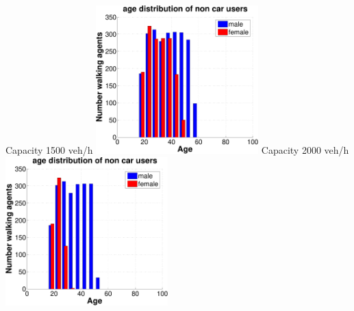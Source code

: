 {  \createsubfigure%
  {Capacity 1500 veh/h}%
  {\includegraphics[width=0.47\textwidth, angle=0, trim=0mm 0mm 0mm 9mm, clip=true]{extending/figures/MultiModalSimulation/simulations/age_distribution_scatter_1500}}%
  {\label{}}%
  {\hspace{3mm}}%
  \createsubfigure%
  {Capacity 2000 veh/h}%
  {\includegraphics[width=0.47\textwidth, angle=0, trim=0mm 0mm 0mm 9mm, clip=true]{extending/figures/MultiModalSimulation/simulations/age_distribution_scatter_2000}}%
  {\label{}}%
  {\vspace{5.5mm}}%

}
